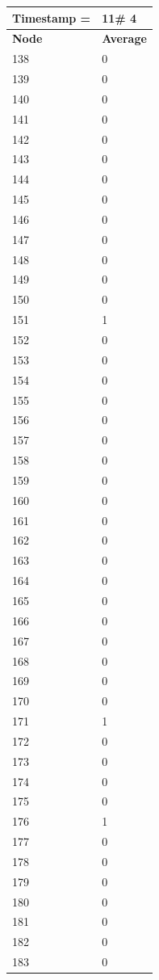 \begin{tabular}{|l||l|}
\hline
\textbf{Timestamp =} & \textbf{11}\# 4\\\hline
	\textbf{Node} & \textbf{Average} \\ \hline
\hline
	138 & 0 \\ \hline
	139 & 0 \\ \hline
	140 & 0 \\ \hline
	141 & 0 \\ \hline
	142 & 0 \\ \hline
	143 & 0 \\ \hline
	144 & 0 \\ \hline
	145 & 0 \\ \hline
	146 & 0 \\ \hline
	147 & 0 \\ \hline
	148 & 0 \\ \hline
	149 & 0 \\ \hline
	150 & 0 \\ \hline
	151 & 1 \\ \hline
	152 & 0 \\ \hline
	153 & 0 \\ \hline
	154 & 0 \\ \hline
	155 & 0 \\ \hline
	156 & 0 \\ \hline
	157 & 0 \\ \hline
	158 & 0 \\ \hline
	159 & 0 \\ \hline
	160 & 0 \\ \hline
	161 & 0 \\ \hline
	162 & 0 \\ \hline
	163 & 0 \\ \hline
	164 & 0 \\ \hline
	165 & 0 \\ \hline
	166 & 0 \\ \hline
	167 & 0 \\ \hline
	168 & 0 \\ \hline
	169 & 0 \\ \hline
	170 & 0 \\ \hline
	171 & 1 \\ \hline
	172 & 0 \\ \hline
	173 & 0 \\ \hline
	174 & 0 \\ \hline
	175 & 0 \\ \hline
	176 & 1 \\ \hline
	177 & 0 \\ \hline
	178 & 0 \\ \hline
	179 & 0 \\ \hline
	180 & 0 \\ \hline
	181 & 0 \\ \hline
	182 & 0 \\ \hline
	183 & 0 \\ \hline
\end{tabular}
